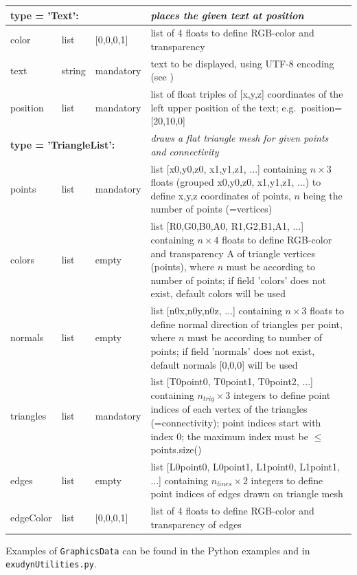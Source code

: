 \begin{center}
\begin{longtable}{| p{3cm} | p{2cm} | p{3cm} | p{7.5cm} |}
	\multicolumn{3}{l}{\parbox{8cm}{\bf type = 'Text': }} & \multicolumn{1}{l}{\parbox{7.5cm}{\it places the given text at position}}\\ \hline
  color & list & [0,0,0,1] & list of 4 floats to define RGB-color and transparency\\ \hline
  text & string & mandatory & text to be displayed, using UTF-8 encoding (see {sec:utf8})\\ \hline
  position & list & mandatory & list of float triples of [x,y,z] coordinates of the left upper position of the text; e.g.\ position=[20,10,0] \\ \hline
	\multicolumn{3}{l}{\parbox{8cm}{\bf type = 'TriangleList': }} & \multicolumn{1}{l}{\parbox{7.5cm}{\it draws a flat triangle mesh for given points and connectivity}}\\ \hline
  points & list & mandatory & list [x0,y0,z0, x1,y1,z1, ...] containing $n \times 3$ floats (grouped x0,y0,z0, x1,y1,z1, ...) to define x,y,z coordinates of points, $n$ being the number of points (=vertices)\\ \hline
  colors & list & empty & list [R0,G0,B0,A0, R1,G2,B1,A1, ...] containing $n \times 4$ floats to define RGB-color and transparency A of triangle vertices (points), where $n$ must be according to number of points; if field 'colors' does not exist, default colors will be used\\ \hline
  normals & list & empty & list [n0x,n0y,n0z, ...] containing $n \times 3$ floats to define normal direction of triangles per point, where $n$ must be according to number of points; if field 'normals' does not exist, default normals [0,0,0] will be used\\ \hline
  triangles & list &  mandatory & list [T0point0, T0point1, T0point2, ...] containing $n_{trig} \times 3$ integers to define point indices of each vertex of the triangles (=connectivity); point indices start with index 0; the maximum index must be $\le$ points.size()\\ \hline
  edges & list &  empty & list [L0point0, L0point1, L1point0, L1point1, ...] containing $n_{lines} \times 2$ integers to define point indices of edges drawn on triangle mesh\\ \hline
 edgeColor & list &  [0,0,0,1] & list of 4 floats to define RGB-color and transparency of edges \\ \hline
\end{longtable}
%
\end{center}
%
Examples of \texttt{GraphicsData} can be found in the Python examples and in \texttt{exudynUtilities.py}.

